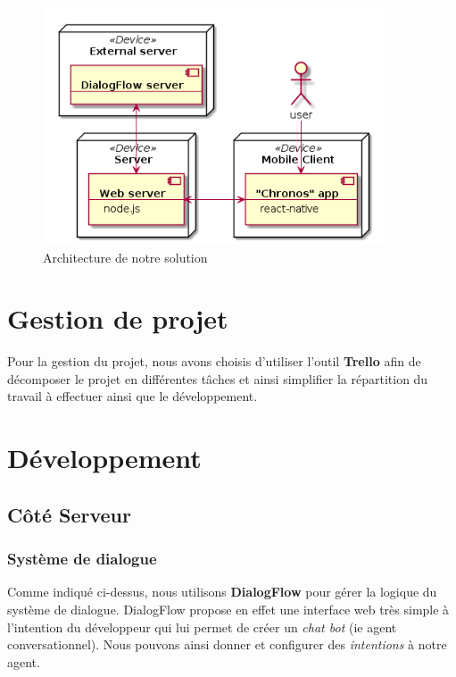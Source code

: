 \begin{figure}[H]
	\centering
		\centering
		\includegraphics[width=0.9\textwidth]{../docs/conception/build/architectureDiagram.png}
		\caption{Architecture de notre solution}
\end{figure}


\section{Gestion de projet}

Pour la gestion du projet, nous avons choisis d'utiliser l'outil \textbf{Trello}\cite{trello} afin de décomposer le projet en différentes tâches et ainsi simplifier 
la répartition du travail à effectuer ainsi que le développement. 

\section{Développement}

\subsection{Côté Serveur}

\subsubsection{Système de dialogue}

Comme indiqué ci-dessus, nous utilisons \textbf{DialogFlow} pour gérer la logique du système de dialogue. DialogFlow propose en effet une interface web très simple à 
l'intention du développeur qui lui permet de créer un \emph{chat bot} (ie agent conversationnel). Nous pouvons ainsi donner et configurer des \emph{intentions} à notre agent.\\

